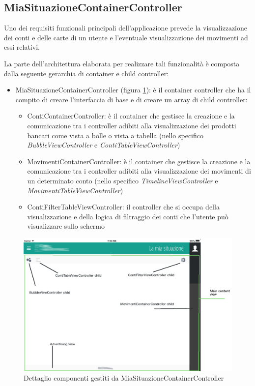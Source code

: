 \subsection{MiaSituazioneContainerController}
\label{parag:miasituaz}
Uno dei requisiti funzionali principali dell'applicazione prevede la visualizzazione dei conti e delle carte di un utente e l'eventuale visualizzazione dei movimenti ad essi relativi.

La parte dell'architettura elaborata per realizzare tali funzionalità è composta dalla seguente gerarchia di container e child controller:

\begin{itemize}
 \item MiaSituazioneContainerController (figura \ref{fig:miasituazione}): è il container controller che ha il compito di creare l'interfaccia di base e di creare un array di child controller:
 \begin{itemize}
  \item ContiContainerController: è il container che gestisce la creazione e la comunicazione tra i controller adibiti alla visualizzazione dei prodotti bancari come vista a bolle o vista a tabella (nello specifico \emph{BubbleViewController} e \emph{ContiTableViewController})
  \item MovimentiContainerController: è il container che gestisce la creazione e la comunicazione tra i controller adibiti alla visualizzazione dei movimenti di un determinato conto (nello specifico \emph{TimelineViewController} e \emph{MovimentiTableViewController})
  \item ContiFilterTableViewController: il controller che si occupa della visualizzazione e della logica di filtraggio dei conti che l'utente può visualizzare sullo schermo
 \end{itemize}
\end{itemize}
\begin{figure}[!htbp]
\centering
\includegraphics[scale=0.35]{dettagli/miasituazione.png}
\caption{Dettaglio componenti gestiti da MiaSituazioneContainerController}
\label{fig:miasituazione}
\end{figure}
